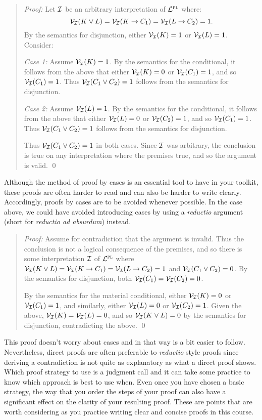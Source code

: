 \begin{quote} 
  \textit{Proof:}
  Let $\mathcal{I}$ be an arbitrary interpretation of $\mathcal{L}^{\textsc{pl}}$ where:
    $$\mathcal{V}_{\mathcal{I}}(K \vee L) = \mathcal{V}_{\mathcal{I}}(K \rightarrow C_1) = \mathcal{V}_{\mathcal{I}}(L \rightarrow C_2) = 1.$$ 
  By the semantics for disjunction, either $\mathcal{V}_{\mathcal{I}}(K) = 1$ or $\mathcal{V}_{\mathcal{I}}(L) = 1$.
  Consider:
  
  \textit{Case 1:}
  Assume $\mathcal{V}_{\mathcal{I}}(K) = 1$.
  By the semantics for the conditional, it follows from the above that either $\mathcal{V}_{\mathcal{I}}(K) = 0$ or $\mathcal{V}_{\mathcal{I}}(C_1) = 1$, and so $\mathcal{V}_{\mathcal{I}}(C_1) = 1$.
  Thus $\mathcal{V}_{\mathcal{I}}(C_1 \vee C_2) = 1$ follows from the semantics for disjunction.

  \textit{Case 2:}
  Assume $\mathcal{V}_{\mathcal{I}}(L) = 1$.
  By the semantics for the conditional, it follows from the above that either $\mathcal{V}_{\mathcal{I}}(L) = 0$ or $\mathcal{V}_{\mathcal{I}}(C_2) = 1$, and so $\mathcal{V}_{\mathcal{I}}(C_1) = 1$.
  Thus $\mathcal{V}_{\mathcal{I}}(C_1 \vee C_2) = 1$ follows from the semantics for disjunction.

  Thus $\mathcal{V}_{\mathcal{I}}(C_1 \vee C_2) = 1$ in both cases. 
  Since $\mathcal{I}$ was arbitrary, the conclusion is true on any interpretation where the premises true, and so the argument is valid. 
  \qed
\end{quote}

Although the method of proof by cases is an essential tool to have in your toolkit, these proofs are often harder to read and can also be harder to write clearly.
Accordingly, proofs by cases are to be avoided whenever possible.
In the case above, we could have avoided introducing cases by using a \textit{reductio} argument (short for \textit{reductio ad absurdum}) instead.

\begin{quote} 
  \textit{Proof:}
  Assume for contradiction that the argument is invalid.
  Thus the conclusion is not a logical consequence of the premises, and so there is some interpretation $\mathcal{I}$ of $\mathcal{L}^{\textsc{pl}}$ where $\mathcal{V}_{\mathcal{I}}(K \vee L) = \mathcal{V}_{\mathcal{I}}(K \rightarrow C_1) = \mathcal{V}_{\mathcal{I}}(L \rightarrow C_2) = 1$ and $\mathcal{V}_{\mathcal{I}}(C_1 \vee C_2) = 0$. 
  By the semantics for disjunction, both $\mathcal{V}_{\mathcal{I}}(C_1) = \mathcal{V}_{\mathcal{I}}(C_2) = 0$.  

  By the semantics for the material conditional, either $\mathcal{V}_{\mathcal{I}}(K) = 0$ or $\mathcal{V}_{\mathcal{I}}(C_1) = 1$, and similarly, either $\mathcal{V}_{\mathcal{I}}(L) = 0$ or $\mathcal{V}_{\mathcal{I}}(C_2) = 1$.
  Given the above, $\mathcal{V}_{\mathcal{I}}(K) = \mathcal{V}_{\mathcal{I}}(L) = 0$, and so $\mathcal{V}_{\mathcal{I}}(K \vee L) = 0$ by the semantics for disjunction, contradicting the above. 
  \qed
\end{quote}

This proof doesn't worry about cases and in that way is a bit easier to follow.
Nevertheless, direct proofs are often preferable to \textit{reductio} style proofs since deriving a contradiction is not quite as explanatory as what a direct proof shows.
Which proof strategy to use is a judgment call and it can take some practice to know which approach is best to use when.
Even once you have chosen a basic strategy, the way that you order the steps of your proof can also have a significant effect on the clarity of your resulting proof.
These are points that are worth considering as you practice writing clear and concise proofs in this course.

